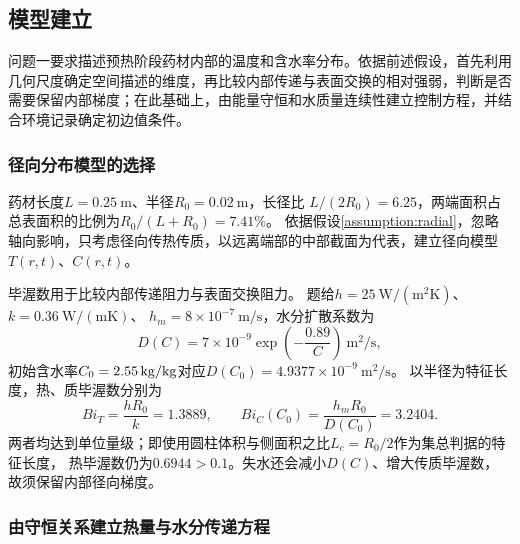 \subsection{模型建立}
\label{sec:p1-model}

问题一要求描述预热阶段药材内部的温度和含水率分布。依据前述假设，首先利用几何尺度确定空间描述的维度，再比较内部传递与表面交换的相对强弱，判断是否需要保留内部梯度；在此基础上，由能量守恒和水质量连续性建立控制方程，并结合环境记录确定初边值条件。

\subsubsection{径向分布模型的选择}

药材长度$L=0.25\ \mathrm{m}$、半径$R_0=0.02\ \mathrm{m}$，长径比
$L/(2R_0)=6.25$，两端面积占总表面积的比例为$R_0/(L+R_0)=7.41\%$。
依据假设\ref{assumption:radial}，忽略轴向影响，只考虑径向传热传质，以远离端部的中部截面为代表，建立径向模型$T(r,t)$、$C(r,t)$。

毕渥数用于比较内部传递阻力与表面交换阻力\cite{heat}。
题给$h=25\ \mathrm{W/(m^2 K)}$、$k=0.36\ \mathrm{W/(m K)}$、
$h_m=8\times10^{-7}\ \mathrm{m/s}$，水分扩散系数为
\begin{equation}
  D(C)=7\times10^{-9}\exp\!\left(-\frac{0.89}{C}\right)\ \mathrm{m^2/s},
  \label{eq:p1-diffusivity}
\end{equation}
初始含水率$C_0=2.55\,\mathrm{kg/kg}$对应$D(C_0)=4.9377\times10^{-9}\ \mathrm{m^2/s}$。
以半径为特征长度，热、质毕渥数分别为
\begin{equation}
  Bi_T=\frac{hR_0}{k}=1.3889,\qquad
  Bi_C(C_0)=\frac{h_mR_0}{D(C_0)}=3.2404.
  \label{eq:p1-biot}
\end{equation}
两者均达到单位量级；即使用圆柱体积与侧面积之比$L_c=R_0/2$作为集总判据的特征长度，
热毕渥数仍为$0.6944>0.1$。失水还会减小$D(C)$、增大传质毕渥数，故须保留内部径向梯度。

\subsubsection{由守恒关系建立热量与水分传递方程}

